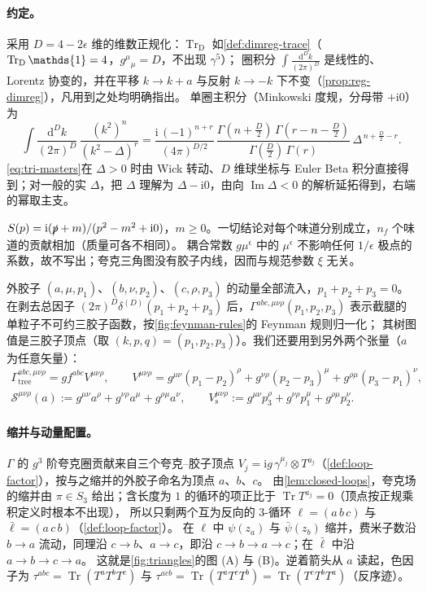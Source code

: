 \documentclass[UTF8,a4paper,11pt,fontset=fandol]{ctexart}
\let\amsmathbb\mathbb
\renewcommand{\mathbb}[1]{\ifx1#1\mathds{1}\else\amsmathbb{#1}\fi}
\theoremstyle{cplain}
\theoremstyle{cdefinition}
\theoremstyle{cremark}
\numberwithin{equation}{section}
\DeclareMathOperator{\Tr}{Tr}
\DeclareMathOperator{\Imag}{Im}
\newcommand{\TrD}{\operatorname{Tr}_{\mathrm{D}}}   %
\newcommand{\sla}[1]{\slashed{#1}}                  %
\newcommand{\dd}{\mathrm{d}}                         %
\newcommand{\ii}{\mathrm{i}}                        %
\begin{document}
\paragraph{约定。}
采用 $D=4-2\epsilon$ 维的维数正规化\cite{tHooftVeltman1972,BolliniGiambiagi1972}：$\TrD$ 如\cref{def:dimreg-trace}（$\TrD\mathbb 1=4$，$g^\mu{}_\mu=D$，不出现 $\gamma^5$）；
圈积分 $\int\frac{\dd^Dk}{(2\pi)^D}$ 是线性的、Lorentz 协变的，并在平移 $k\to k+a$ 与反射 $k\to-k$ 下不变（\cref{prop:reg-dimreg}），凡用到之处均明确指出。
单圈主积分（Minkowski 度规，分母带 $+\ii0$）为
\begin{equation}\label{eq:tri-masters}
\int\frac{\dd^Dk}{(2\pi)^D}\,\frac{(k^2)^n}{(k^2-\Delta)^{r}}=\frac{\ii\,(-1)^{n+r}}{(4\pi)^{D/2}}\,\frac{\Gamma(n+\frac D2)\,\Gamma(r-n-\frac D2)}{\Gamma(\frac D2)\,\Gamma(r)}\,\Delta^{\,n+\frac D2-r}.
\end{equation}
\cref{eq:tri-masters}在 $\Delta>0$ 时由 Wick 转动、$D$ 维球坐标与 Euler Beta 积分直接得到；对一般的实 $\Delta$，把 $\Delta$ 理解为 $\Delta-\ii0$，由向 $\Imag\Delta<0$ 的解析延拓得到，右端的幂取主支。

$S(p)=\ii(\sla p+m)/(p^2-m^2+\ii0)$，$m\ge0$。一切结论对每个味道分别成立，$n_f$ 个味道的贡献相加（质量可各不相同）。
耦合常数 $g\mu^{\epsilon}$ 中的 $\mu^\epsilon$ 不影响任何 $1/\epsilon$ 极点的系数，故不写出；夸克三角图没有胶子内线，因而与规范参数 $\xi$ 无关。

外胶子 $(a,\mu,p_1)$、$(b,\nu,p_2)$、$(c,\rho,p_3)$ 的动量全部流入，$p_1+p_2+p_3=0$。
在剥去总因子 $(2\pi)^D\delta^{(D)}(p_1+p_2+p_3)$ 后，$\Gamma^{abc,\mu\nu\rho}(p_1,p_2,p_3)$ 表示截腿的单粒子不可约三胶子函数，按\cref{fig:feynman-rules}的 Feynman 规则归一化；
其树图值是三胶子顶点（取 $(k,p,q)=(p_1,p_2,p_3)$）。我们还要用到另外两个张量（$a$ 为任意矢量）：
\begin{gather}
\Gamma^{abc,\mu\nu\rho}_{\text{tree}}=g f^{abc}V^{\mu\nu\rho},\qquad
V^{\mu\nu\rho}=g^{\mu\nu}(p_1-p_2)^\rho+g^{\nu\rho}(p_2-p_3)^\mu+g^{\rho\mu}(p_3-p_1)^\nu ,\label{eq:tri-tree}\\
\mathcal S^{\mu\nu\rho}(a):=g^{\mu\nu}a^\rho+g^{\nu\rho}a^\mu+g^{\rho\mu}a^\nu,\qquad
V_{\mathrm s}^{\mu\nu\rho}:=g^{\mu\nu}p_3^\rho+g^{\nu\rho}p_1^\mu+g^{\rho\mu}p_2^\nu .\label{eq:tri-Sdef}
\end{gather}

\paragraph{缩并与动量配置。}
$\Gamma$ 的 $g^3$ 阶夸克圈贡献来自三个夸克--胶子顶点 $V_j=\ii g\,\gamma^{\mu_j}\otimes T^{a_j}$（\cref{def:loop-factor}），按与之缩并的外胶子命名为顶点 $a$、$b$、$c$。
由\cref{lem:closed-loops}，夸克场的缩并由 $\pi\in S_3$ 给出；含长度为 $1$ 的循环的项正比于 $\Tr T^{a_j}=0$（顶点按正规乘积定义时根本不出现），
所以只剩两个互为反向的 $3$-循环 $\ell=(a\,b\,c)$ 与 $\bar\ell=(a\,c\,b)$（\cref{def:loop-factor}）。
在 $\ell$ 中 $\psi(z_a)$ 与 $\bar\psi(z_b)$ 缩并，费米子数沿 $b\to a$ 流动，同理沿 $c\to b$、$a\to c$，即沿 $c\to b\to a\to c$；在 $\bar\ell$ 中沿 $a\to b\to c\to a$。
这就是\cref{fig:triangles}的图 (A) 与 (B)。逆着箭头从 $a$ 读起，色因子为 $\tau^{abc}=\Tr(T^aT^bT^c)$ 与 $\tau^{acb}=\Tr(T^aT^cT^b)=\Tr(T^cT^bT^a)$（反序迹）。
\end{document}
